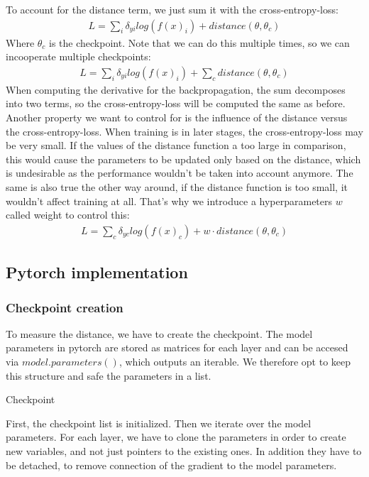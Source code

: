 To account for the distance term, we just sum it with the cross-entropy-loss:
\begin{align}
    L=\sum_{i} \delta_{yi} log(f(x)_i) + distance(\theta, \theta_c)
\end{align}
Where $\theta_c$ is the checkpoint.
Note that we can do this multiple times, so we can incooperate multiple
checkpoints:
\begin{align}
    L=\sum_{i} \delta_{yi} log(f(x)_i) + \sum_c distance(\theta, \theta_c)
\end{align}
 When computing the derivative for the backpropagation, the sum
decomposes into two terms, so the cross-entropy-loss will be computed the same
as before. Another property we want to control for is the influence of the
distance versus the cross-entropy-loss. When training is in later stages, the
cross-entropy-loss may be very small. If the values of the distance function a
too large in comparison, this would cause the parameters to be updated only
based on the distance, which is undesirable as the performance wouldn't be taken
into account anymore. The same is also true the other way around, if the
distance function is too small, it wouldn't affect training at all. That's why
we introduce a hyperparameters $w$ called weight to control this:
\begin{align}
    L=\sum_{c} \delta_{yc} log(f(x)_c) + w \cdot distance(\theta, \theta_c)
\end{align}

\subsection{Pytorch implementation}

\subsubsection{Checkpoint creation}
To measure the distance, we have to create the checkpoint. The model parameters
in pytorch are stored as matrices for each layer and can be accesed via
$model.parameters()$, which outputs an iterable. We therefore opt to keep this
structure and safe the parameters in a list.
\begin{algorithm}[htbp]
    \caption{Checkpoint}\label{alg:Checkpoint}
    \lstset{language=Python}
    
\end{algorithm}
\newline
First, the checkpoint list is initialized. Then we iterate over the model
parameters. For each layer, we have to clone the parameters in order to create
new variables, and not just pointers to the existing ones. In addition they have
to be detached, to remove connection of the gradient to the model parameters.

